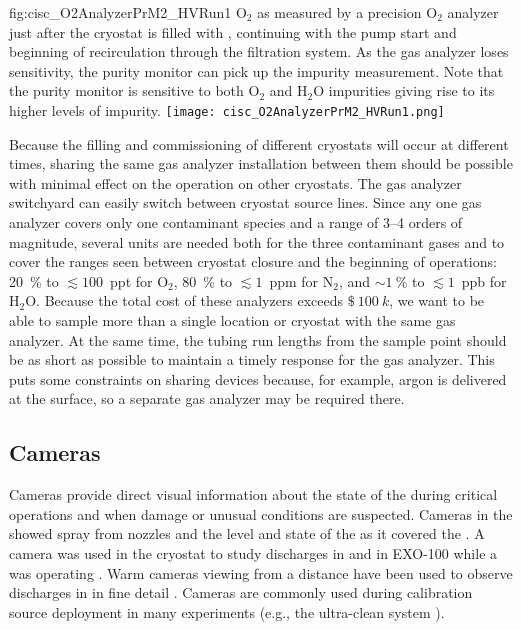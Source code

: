 \begin{dunefigure}{fig:cisc_O2AnalyzerPrM2_HVRun1}
  {$\text{O}_2$ as measured by a precision $\text{O}_2$ analyzer just after the  cryostat is filled with \lar, continuing with the \lar pump start and beginning of \lar recirculation through the filtration system. As the gas analyzer loses sensitivity, the purity monitor can pick up the impurity measurement. Note that the purity monitor is sensitive to both $\text{O}_2$ and $\text{H}_2\text{O}$ impurities giving rise to its higher levels of impurity.}
  \texttt{[image: cisc\_O2AnalyzerPrM2\_HVRun1.png]}
\end{dunefigure}

Because the filling and commissioning of different cryostats will occur at different times, sharing the same gas analyzer installation between them should be possible with minimal effect on the operation on other cryostats. The gas analyzer switchyard can easily switch between cryostat source lines.
Since any one gas analyzer covers only one contaminant species and a range of \numrange{3}{4} orders of magnitude, several units are needed both for the three contaminant gases and to cover the ranges seen between cryostat closure and the beginning of  operations:
\SI{20}{\percent} to $\lesssim 100$~ppt for $\text{O}_2$,
\SI{80}{\percent} to $\lesssim 1$~ppm for $\text{N}_2$, and
$\sim \SI{1}{\percent}$ to $\lesssim 1$~ppb for $\text{H}_2\text{O}$.
Because the total cost of these analyzers exceeds $\SI{100}[\mathdollar]{k}$, we want to be able to  sample more than a single location or cryostat with the same gas analyzer. At the same time, the tubing run lengths from the sample point should be as short as possible to maintain a timely response for the gas analyzer. This puts some constraints on sharing devices because, for example, argon is delivered at the surface, so a separate gas analyzer may be required there. %


\subsection{Cameras}

Cameras provide direct visual information about the state of the
 during critical operations and when damage or unusual
conditions are suspected.  Cameras in the  showed spray from \cooldown
nozzles and the level and state of the \lar as it covered the  \cite{Murphy:20170516}.  A camera was
used in the  
cryostat\cite{Adamowski:2014daa} to study  discharges in
\lar and in EXO-100 while a  was operating
\cite{Delaquis:2013hva}.  Warm cameras viewing \lar from a distance
have been used to observe  discharges in \lar in
fine detail \cite{Auger:2015xlo}.  Cameras are commonly used during
calibration source deployment in many experiments (e.g., the
\kamland ultra-clean system \cite{Banks:2014hra}).

